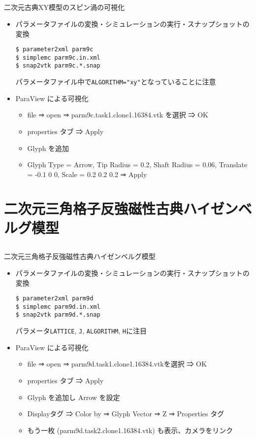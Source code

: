 \subsection*{\redb\whiteb\greenm}
\begin{frame}[t,fragile]{二次元古典XY模型のスピン渦の可視化}
  \begin{itemize}
  \item パラメータファイルの変換・シミュレーションの実行・スナップショットの変換
\begin{lstlisting}
$ parameter2xml parm9c
$ simplemc parm9c.in.xml
$ snap2vtk parm9c.*.snap
\end{lstlisting}
パラメータファイル中で\verb+ALGORITHM="xy"+となっていることに注意
  \item ParaView による可視化
    \begin{itemize}
      \item file ⇒ open ⇒ parm9c.task1.clone1.16384.vtk を選択 ⇒ OK
      \item properties タブ ⇒ Apply
      \item Glyph を追加
      \item Glyph Type = Arrow, Tip Radius = 0.2, Shaft Radius = 0.06, Translate = -0.1 0 0, Scale = 0.2 0.2 0.2 ⇒ Apply
    \end{itemize}
  \end{itemize}
\end{frame}

\section{二次元三角格子反強磁性古典ハイゼンベルグ模型}

\subsection*{\redb\whiteb\greenm}
\begin{frame}[t,fragile]{二次元三角格子反強磁性古典ハイゼンベルグ模型}
  \begin{itemize}
  \item パラメータファイルの変換・シミュレーションの実行・スナップショットの変換
\begin{lstlisting}
$ parameter2xml parm9d
$ simplemc parm9d.in.xml
$ snap2vtk parm9d.*.snap
\end{lstlisting}
パラメータ\verb+LATTICE+, \verb+J+, \verb+ALGORITHM+, \verb+H+に注目
  \item ParaView による可視化
    \begin{itemize}
      \item file ⇒ open ⇒ parm9d.task1.clone1.16384.vtkを選択 ⇒  OK
      \item properties タブ ⇒ Apply
      \item Glyph を追加し Arrow を設定
      \item Displayタグ ⇒ Color by ⇒ Glyph Vector ⇒ Z ⇒ Properties タグ
      \item もう一枚 (parm9d.task2.clone1.16384.vtk) も表示、カメラをリンク
    \end{itemize}
  \end{itemize}
\end{frame}


